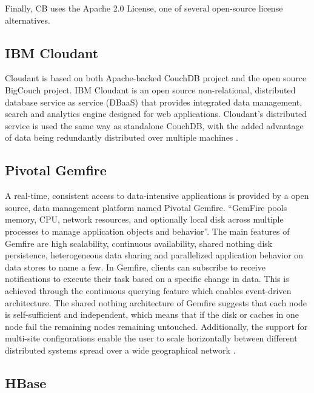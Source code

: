      Finally, CB uses the Apache 2.0 License, one of several
     open-source license alternatives. \cite{www-quora-cbs}

\subsection{IBM Cloudant}
     
     Cloudant is based on both Apache-backed CouchDB project and the
     open source BigCouch project. IBM Cloudant is an open source
     non-relational, distributed database service as service (DBaaS)
     that provides integrated data management, search and analytics 
     engine designed for web applications. Cloudant's distributed
     service is used the same way as standalone CouchDB, with the
     added advantage of data being redundantly distributed over
     multiple machines \cite{www-ibm-cloudant}.
   

\subsection{Pivotal Gemfire}
     
     A real-time, consistent access to data-intensive applications is
     provided by a open source, data management platform named Pivotal
     Gemfire. ``GemFire pools memory, CPU, network resources, and
     optionally local disk across multiple processes to manage
     application objects and behavior''. The main features of Gemfire
     are high scalability, continuous availability, shared nothing
     disk persistence, heterogeneous data sharing and parallelized
     application behavior on data stores to name a few.  In Gemfire,
     clients can subscribe to receive notifications to execute their
     task based on a specific change in data. This is achieved through
     the continuous querying feature which enables event-driven
     architecture. The shared nothing architecture of Gemfire suggests
     that each node is self-sufficient and independent, which means
     that if the disk or caches in one node fail the remaining nodes
     remaining untouched. Additionally, the support for multi-site
     configurations enable the user to scale horizontally between
     different distributed systems spread over a wide geographical
     network \cite{www-gemfire}.
     
\subsection{HBase}

